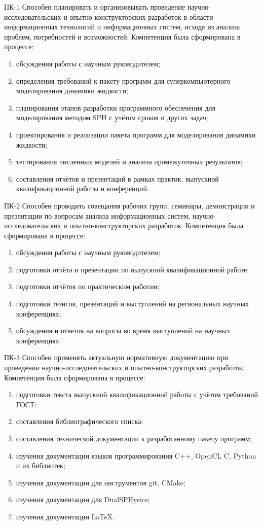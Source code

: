ПК-1 Способен планировать и организовывать проведение научно-исследовательских и 
опытно-конструкторских разработок в области информационных технологий и информационных систем, 
исходя из анализа проблем, потребностей и возможностей.
Компетенция была сформирована в процессе:
\begin{enumerate}
    \item обсуждения работы с научным руководителем;
    \item определения требований к пакету программ для суперкомпьютерного моделирования динамики жидкости;
    \item планирования этапов разработки программного обеспечения для моделирования методом SPH с учётом сроков и других задач;
    \item проектирования и реализации пакета программ для моделирования динамики жидкости;
    \item тестирования численных моделей и анализа промежуточных результатов;
    \item составления отчётов и презентаций в рамках практик, выпускной квалификационной работы и конференций.
\end{enumerate}

ПК-2 Способен проводить совещания рабочих групп, семинары, демонстрации и презентации по вопросам анализа информационных систем, 
научно-исследовательских и опытно-конструкторских разработок.
Компетенция была сформирована в процессе:
\begin{enumerate}
    \item обсуждения работы с научным руководителем;
    \item подготовки отчёта и презентации по выпускной квалификационной работе;
    \item подготовки отчётов по практическим работам;
    \item подготовки тезисов, презентаций и выступлений на региональных научных конференциях;
    \item обсуждения и ответов на вопросы во время выступлений на научных конференциях.
\end{enumerate}

ПК-3 Способен применять актуальную нормативную документацию при проведении 
научно-исследовательских и опытно-конструкторских разработок.
Компетенция была сформирована в процессе:
\begin{enumerate}
    \item подготовки текста выпускной квалификационной работы с учётом требований ГОСТ;
    \item составления библиографического списка;
    \item составления технической документации к разработанному пакету программ;
    \item изучения документации языков программирования C++, OpenCL C, Python и их библиотек;
    \item изучения документации для инструментов git, CMake;
    \item изучения документации для DualSPHysics;
    \item изучения документации \LaTeX. 
\end{enumerate}

